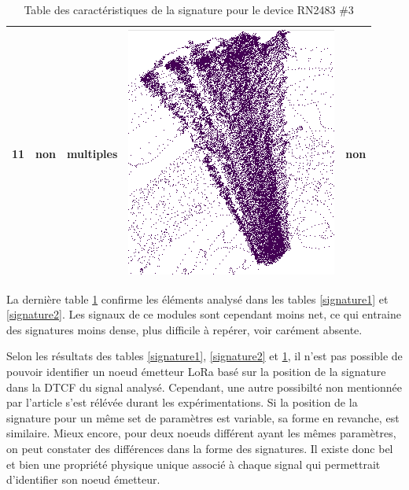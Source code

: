 \begin{table}[h]
\begin{tabular}{|c|c|c|c|c|}
\hline
11 & non & multiples & \includegraphics[scale=0.2]{images/set33.png}  & non \\
\hline
\end{tabular}
\caption{Table des caractéristiques de la signature pour le device RN2483 \#3}
\label{signature3}
\end{table}

La dernière table \ref{signature3} confirme les éléments analysé dans les tables \ref{signature1} et \ref{signature2}. Les signaux de ce modules sont cependant moins net, ce qui entraine des signatures moins dense, plus difficile à repérer, voir carément absente.

\vspace{0.1cm}

Selon les résultats des tables \ref{signature1}, \ref{signature2} et \ref{signature3}, il n'est pas possible de pouvoir identifier un noeud émetteur LoRa basé sur la position de la signature dans la DTCF du signal analysé. Cependant, une autre possibilté non mentionnée par l'article s'est rélévée durant les expérimentations. Si la position de la signature pour un même set de paramètres est variable, sa forme en revanche, est similaire. Mieux encore, pour deux noeuds différent ayant les mêmes paramètres, on peut constater des différences dans la forme des signatures. Il existe donc bel et bien une propriété physique unique associé à chaque signal qui permettrait d'identifier son noeud émetteur.